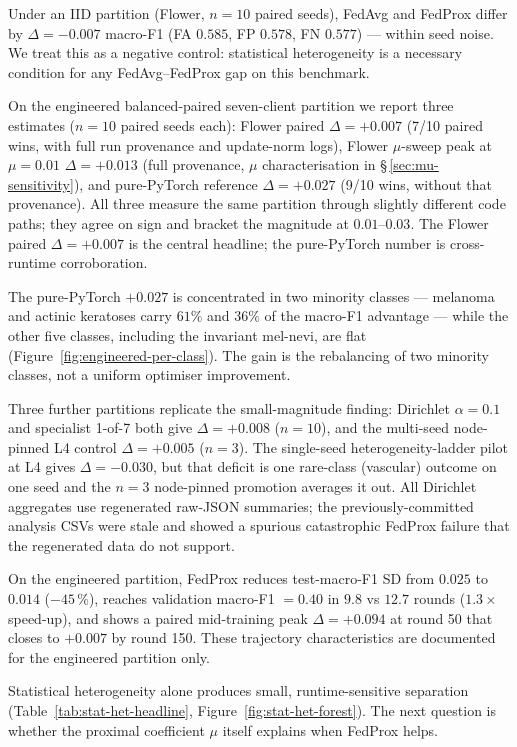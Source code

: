 \documentclass[11pt,a4paper]{report}
\begin{document}
Under an IID partition (Flower, $n=10$ paired seeds), FedAvg and FedProx
differ by $\Delta = -0.007$ macro-F1 (FA $0.585$, FP $0.578$, FN $0.577$) ---
within seed noise. We treat this as a negative control: statistical
heterogeneity is a necessary condition for any FedAvg--FedProx gap on this
benchmark.

On the engineered balanced-paired seven-client partition we report three
estimates ($n=10$ paired seeds each): Flower paired $\Delta = +0.007$ (7/10
paired wins, with full run provenance and update-norm logs), Flower $\mu$-sweep
peak at $\mu = 0.01$ $\Delta = +0.013$ (full provenance, $\mu$ characterisation
in \S\,\ref{sec:mu-sensitivity}), and pure-PyTorch reference $\Delta = +0.027$
(9/10 wins, without that provenance). All three measure the same partition through
slightly different code paths; they agree on sign and bracket the magnitude
at $0.01$--$0.03$. The Flower paired $\Delta = +0.007$ is the central
headline; the pure-PyTorch number is cross-runtime corroboration.

The pure-PyTorch $+0.027$ is concentrated in two minority classes --- melanoma
and actinic keratoses carry $61\%$ and $36\%$ of the macro-F1 advantage --- while
the other five classes, including the invariant mel-nevi, are flat
(Figure~\ref{fig:engineered-per-class}). The gain is the rebalancing of two
minority classes, not a uniform optimiser improvement.

Three further partitions replicate the small-magnitude finding: Dirichlet
$\alpha = 0.1$ and specialist 1-of-7 both give $\Delta = +0.008$ ($n=10$), and
the multi-seed node-pinned L4 control $\Delta = +0.005$ ($n=3$). The single-seed
heterogeneity-ladder pilot at L4 gives $\Delta = -0.030$, but that deficit is one
rare-class (vascular) outcome on one seed and the $n=3$ node-pinned promotion
averages it out. All Dirichlet aggregates use regenerated raw-JSON summaries; the
previously-committed analysis CSVs were stale and showed a spurious catastrophic
FedProx failure that the regenerated data do not support.

On the engineered partition, FedProx reduces test-macro-F1 SD from $0.025$
to $0.014$ ($-45\,\%$), reaches validation macro-F1 $= 0.40$ in $9.8$ vs
$12.7$ rounds ($1.3\times$ speed-up), and shows a paired mid-training peak
$\Delta = +0.094$ at round 50 that closes to $+0.007$ by round 150. These
trajectory characteristics are documented for the engineered partition only.

Statistical heterogeneity alone produces small, runtime-sensitive separation
(Table~\ref{tab:stat-het-headline}, Figure~\ref{fig:stat-het-forest}). The
next question is whether the proximal coefficient $\mu$ itself explains when
FedProx helps.
\end{document}
